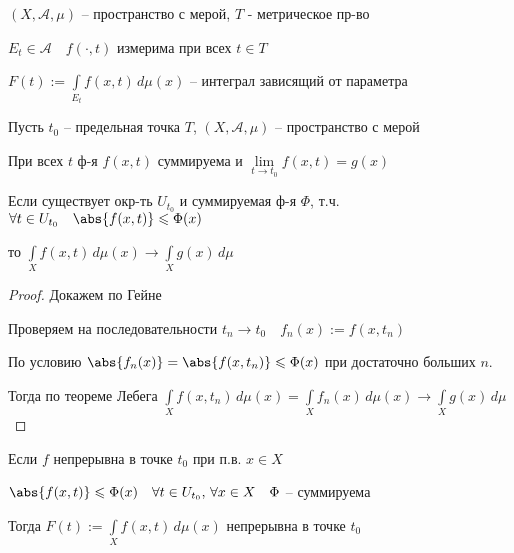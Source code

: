 
\begin{definition}\thmslashn
	
	$(X, \mathcal{A}, \mu)$ -- пространство с  мерой, $T$ - метрическое пр-во
	
	$E_t \in \mathcal{A} \quad f(\cdot, t)$ измерима при всех $t \in T$
	
	$F(t):= \int\limits_{E_t} f(x, t) \,d\mu (x)$ -- интеграл зависящий от параметра
	
\end{definition}

\begin{theorem}\thmslashn
	
	Пусть $t_0$ -- предельная точка $T$, $(X, \mathcal{A}, \mu)$ -- пространство с  мерой
	
	При всех $t$ ф-я $f(x, t)$ суммируема и $\lim\limits_{t\to t_0}f(x, t) = g(x)$
	
	Если существует окр-ть $U_{t_0}$ и суммируемая ф-я $\Phi$, т.ч. $\forall t \in U_{t_0}\quad \abs{f(x, t)} \leqslant \Phi(x)$
	
	то $\int\limits_{X} f(x, t) \,d\mu (x) \to \int\limits_{X} g(x)\,d\mu$
	
\end{theorem}

\begin{proof}\thmslashn
	
	Докажем по Гейне
	
	Проверяем на последовательности $t_n \to t_0 \quad f_n(x) := f(x, t_n)$
	
	По условию $\abs{f_n(x)} = \abs{f(x, t_n)} \leqslant \Phi(x)$ при достаточно больших $n$. 
	
	Тогда по теореме Лебега $\int\limits_{X} f(x, t_n) \,d\mu (x) = \int\limits_{X} f_n(x) \,d\mu (x)\to \int\limits_{X} g(x)\,d\mu$ 
	
\end{proof}

\begin{consequence}\thmslashn
	
	Если $f$ непрерывна в точке $t_0$ при п.в. $x \in X$
	
	$\abs{f(x, t)} \leqslant \Phi(x) \quad \forall t\in U_{t_0},\, \forall x \in X \quad \Phi$ -- суммируема
	
	Тогда $F(t) := \int\limits_{X} f(x, t) \,d\mu (x)$ непрерывна в точке $t_0$
	
\end{consequence}

